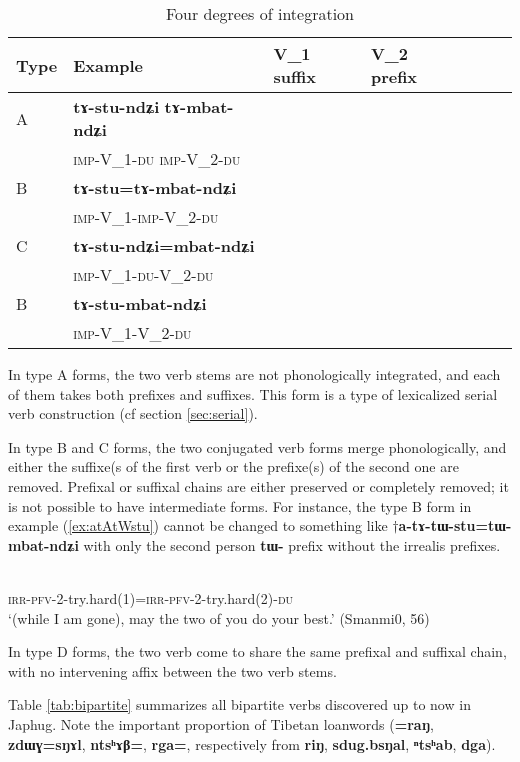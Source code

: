\documentclass[oldfontcommands,oneside,a4paper,11pt]{article}
\newcommand{\ipa}[1]{{\phon\textbf{#1}}}
\newcommand{\Y}{\Checkmark}
\newcommand{\N}{}
\newcommand{\refb}[1]{(\ref{#1})}
\begin{document}
\begin{table}[h]
\caption{Four degrees of integration} \centering \label{tab:four}
\begin{tabular}{lllllll}
\toprule
Type & Example & V_1 suffix & V_2 prefix \\
\midrule
A& \ipa{tɤ-stu-ndʑi} \ipa{tɤ-mbat-ndʑi} &\Y &\Y \\
 &\textsc{imp}-V_1-\textsc{du}  \textsc{imp}-V_2-\textsc{du} \\
B& \ipa{tɤ-stu=tɤ-mbat-ndʑi} &\N  &\Y \\
 &\textsc{imp}-V_1-\textsc{imp}-V_2-\textsc{du} \\
C& \ipa{tɤ-stu-ndʑi=mbat-ndʑi} &\Y  &\N \\
 &\textsc{imp}-V_1-\textsc{du}-V_2-\textsc{du} \\
B& \ipa{tɤ-stu-mbat-ndʑi} &\N  &\N \\
 &\textsc{imp}-V_1-V_2-\textsc{du} \\
\bottomrule
\end{tabular}
\end{table}

In type A forms, the two verb stems are not phonologically integrated, and each of them takes both prefixes and suffixes. This form is a type of lexicalized serial verb construction (cf section \ref{sec:serial}).

In type B and C forms, the two conjugated verb forms merge phonologically, and either the suffixe(s  of the first verb or the prefixe(s) of the second one are removed. Prefixal or suffixal chains are either preserved or completely removed; it is not possible to have intermediate forms. For instance, the type B form in example \refb{ex:atAtWstu} cannot be changed to something like $\dagger$\ipa{a-tɤ-tɯ-stu=tɯ-mbat-ndʑi} with only the second person \ipa{tɯ-} prefix without the irrealis prefixes.

\begin{exe}
\ex \label{ex:atAtWstu}
\gll \ipa{a-tɤ-tɯ-stu=a-tɤ-tɯ-mbat-ndʑi} \\
\textsc{irr-pfv-2}-try.hard(1)=\textsc{irr-pfv-2}-try.hard(2)-\textsc{du} \\
\glt `(while I am gone),  may the two of you do your best.' (Smanmi0, 56)
\end{exe}

In type D forms, the two verb come to share the same prefixal and suffixal chain, with no intervening affix between the two verb stems.

Table \ref{tab:bipartite} summarizes all bipartite verbs discovered up to now in Japhug. Note the important proportion of Tibetan loanwords (\ipa{=raŋ}, \ipa{zdɯɣ=sŋɤl}, \ipa{ntsʰɤβ=}, \ipa{rga=}, respectively from \ipa{riŋ}, \ipa{sdug.bsŋal}, \ipa{ⁿtsʰab}, \ipa{dga}).
\end{document}
